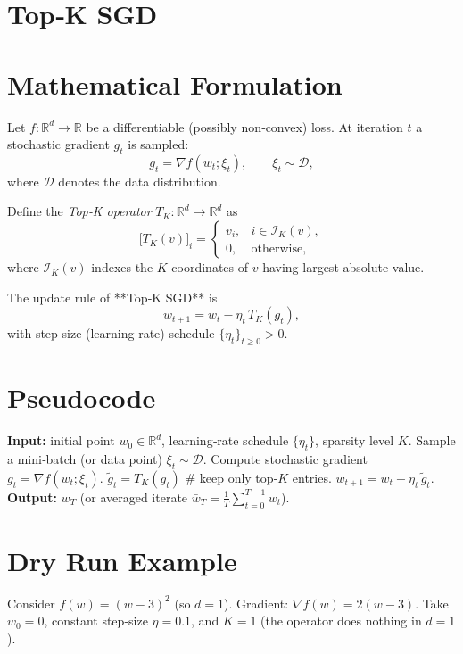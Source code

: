 \documentclass{article}
\newcommand{\R}{\mathbb{R}}
\begin{document}
\section*{Top‑K SGD}

\section*{Mathematical Formulation}
Let $f:\R^{d}\rightarrow\R$ be a differentiable (possibly non‑convex) loss.  
At iteration $t$ a stochastic gradient $g_{t}$ is sampled:
\[
g_{t}= \nabla f(w_{t};\xi_{t}),\qquad \xi_{t}\sim\mathcal{D},
\]
where $\mathcal{D}$ denotes the data distribution.  

Define the \emph{Top‑K operator} $T_{K}:\R^{d}\rightarrow\R^{d}$ as
\[
\big[T_{K}(v)\big]_{i}= 
\begin{cases}
v_{i}, & i\in\mathcal{I}_{K}(v),\\[2mm]
0, & \text{otherwise},
\end{cases}
\]
where $\mathcal{I}_{K}(v)$ indexes the $K$ coordinates of $v$ having largest absolute value.  

The update rule of **Top‑K SGD** is
\[
\boxed{w_{t+1}=w_{t}-\eta_{t}\,T_{K}(g_{t})},
\tag{1}
\]
with step‑size (learning‑rate) schedule $\{\eta_{t}\}_{t\ge 0}>0$.

\section*{Pseudocode}
\begin{algorithm}[H]
\caption{Top‑K SGD}
\begin{algorithmic}[1]
\STATE \textbf{Input:} initial point $w_{0}\in\R^{d}$, learning‑rate schedule $\{\eta_{t}\}$, sparsity level $K$.
    \STATE Sample a mini‑batch (or data point) $\xi_{t}\sim\mathcal{D}$.
    \STATE Compute stochastic gradient $g_{t}= \nabla f(w_{t};\xi_{t})$.
    \STATE $\displaystyle \tilde g_{t}=T_{K}(g_{t})$   \hfill\# keep only top‑$K$ entries.
    \STATE $w_{t+1}= w_{t}-\eta_{t}\,\tilde g_{t}$.
\ENDFOR
\STATE \textbf{Output:} $w_{T}$ (or averaged iterate $\bar w_{T}=\frac1T\sum_{t=0}^{T-1}w_{t}$).
\end{algorithmic}
\end{algorithm}

\section*{Dry Run Example}
Consider $f(w)=(w-3)^{2}$ (so $d=1$).  
Gradient: $\nabla f(w)=2(w-3)$.  
Take $w_{0}=0$, constant step‑size $\eta=0.1$, and $K=1$ (the operator does nothing in $d=1$).
\end{document}
